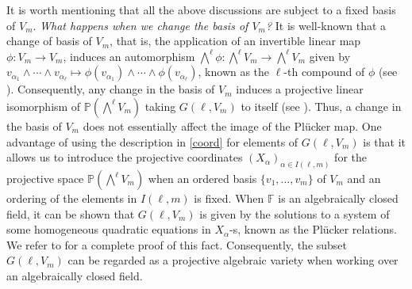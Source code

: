 \documentclass[10pt,a4paper,oneside]{amsproc}
\def\a{{\alpha}}
\def\FF{{\mathbb F}}
\def\PP{{\mathbb P}}
\begin{document}
It is worth mentioning that all the above discussions are subject to a fixed basis of $V_m$. \emph{What happens when we change the basis of $V_m$?} It is well-known that a change of basis of $V_m$, that is, the application of an invertible linear map 
$\phi: V_m \to V_m$, induces an automorphism $\bigwedge^\ell \phi: \bigwedge^\ell V_m \to \bigwedge^\ell V_m$ 
given by $v_{\alpha_1} \wedge \cdots \wedge v_{\alpha_\ell} \mapsto \phi(v_{\alpha_1}) \wedge \cdots \wedge \phi(v_{\alpha_\ell})$, 
known as the $\ell$-th compound of $\phi$ (see \cite[Page 94]{M}). Consequently, any change in the basis of $V_m$ induces a 
projective linear isomorphism of $\PP(\bigwedge^\ell V_m)$ taking $G(\ell, V_m)$ to itself (see \cite[Chapter XIV, 
Section 1]{HP}).
Thus, a change in the basis of $V_m$ does not essentially affect the image of the Pl\"ucker map.  One advantage of using the description in \eqref{coord} for elements of $G(\ell, V_m)$ is that it allows us to introduce the projective coordinates $(X_\a)_{\a \in I(\ell, m)}$ for the projective space $\PP \left(\bigwedge^\ell V_m\right)$ when an ordered basis $\{v_1, \dots, v_m\}$ of $V_m$ and an ordering of the elements in $I(\ell, m)$ is fixed. When $\FF$ is an algebraically closed field, it can be shown that $G(\ell, V_m)$ is given by the solutions to a system of some homogeneous quadratic equations in $X_\a$-s, known as the Plücker relations. We refer to \cite[Theorem 5.2.3]{LB} for a complete proof of this fact. Consequently, the subset $G(\ell, V_m)$ can be regarded as a projective algebraic variety when working over an algebraically closed field.  
\end{document}
